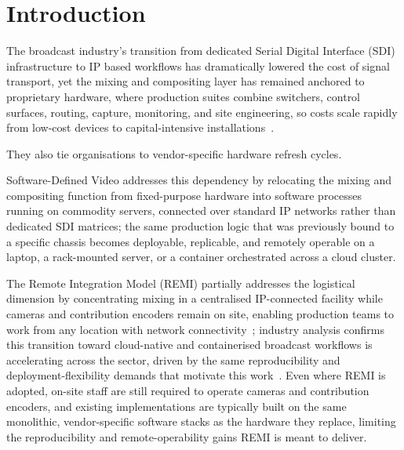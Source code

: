 \documentclass[electronics,article,submit,pdftex,moreauthors]{Definitions/mdpi}
\begin{document}
\section{Introduction}
\label{sec:introduction}


The broadcast industry's transition from dedicated Serial Digital Interface (SDI)~\cite{smpte_sdi} infrastructure to IP based workflows has dramatically lowered the cost of signal transport, yet the mixing and compositing layer has remained anchored to proprietary hardware, where production suites combine switchers, control surfaces, routing, capture, monitoring, and site engineering, so costs scale rapidly from low-cost devices to capital-intensive installations~\cite{blackmagic_atem}.

They also tie organisations to vendor-specific hardware refresh cycles.

Software-Defined Video addresses this dependency by relocating the mixing and compositing function from fixed-purpose hardware into software processes running on commodity servers, connected over standard IP networks rather than dedicated SDI matrices; the same production logic that was previously bound to a specific chassis becomes deployable, replicable, and remotely operable on a laptop, a rack-mounted server, or a container orchestrated across a cloud cluster.

The Remote Integration Model (REMI) partially addresses the logistical dimension by concentrating mixing in a centralised IP-connected facility while cameras and contribution encoders remain on site, enabling production teams to work from any location with network connectivity~\cite{tmbroadcast_remi}; industry analysis confirms this transition toward cloud-native and containerised broadcast workflows is accelerating across the sector, driven by the same reproducibility and deployment-flexibility demands that motivate this work~\cite{haivision_broadcast_report_2025}. Even where REMI is adopted, on-site staff are still required to operate cameras and contribution encoders, and existing implementations are typically built on the same monolithic, vendor-specific software stacks as the hardware they replace, limiting the reproducibility and remote-operability gains REMI is meant to deliver.
\end{document}
